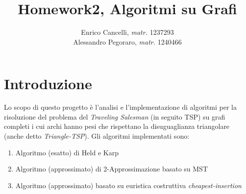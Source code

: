 \documentclass[]{article}
\title{Homework2, Algoritmi su Grafi}
\author{Enrico Cancelli, \textit{matr.} 1237293\\
	Alessandro Pegoraro, \textit{matr.} 1240466}
\begin{document}
\maketitle

\begin{abstract}

\end{abstract}

\section{Introduzione}
Lo scopo di questo  progetto è l'analisi e l'implementazione di algoritmi per la risoluzione del problema del \textit{Traveling Salesman} (in seguito TSP) su grafi completi i cui archi hanno pesi che rispettano la disuguaglianza triangolare (anche detto \textit{Triangle-TSP}).
Gli algoritmi implementati sono:
\begin{enumerate}
	\item Algoritmo (esatto) di Held e Karp
	\item Algoritmo (approssimato) di 2-Approssimazione basato su MST
	\item Algoritmo (approssimato) basato su euristica costruttiva \textit{cheapest-insertion}
\end{enumerate}
\end{document}
